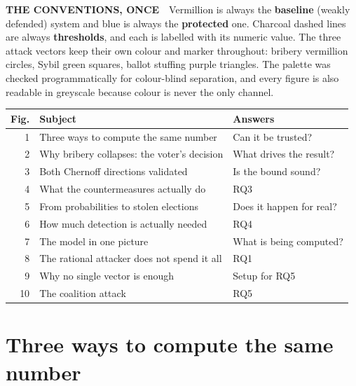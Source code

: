 \documentclass[11pt,a4paper]{article}
\begin{document}
\begin{readbox}
\textsf{\bfseries\footnotesize THE CONVENTIONS, ONCE}\ \
Vermillion is always the \textbf{baseline} (weakly defended) system and
blue is always the \textbf{protected} one. Charcoal dashed lines are
always \textbf{thresholds}, and each is labelled with its numeric value.
The three attack vectors keep their own colour and marker throughout:
bribery vermillion circles, Sybil green squares, ballot stuffing purple
triangles. The palette was checked programmatically for
colour-blind separation, and every figure is also readable in greyscale
because colour is never the only channel.
\end{readbox}

\vspace{0.4em}

\begin{center}
\small
\begin{tabular}{@{}rp{9.0cm}l@{}}
\toprule
\textbf{Fig.} & \textbf{Subject} & \textbf{Answers} \\
\midrule
1  & Three ways to compute the same number       & Can it be trusted? \\
2  & Why bribery collapses: the voter's decision & What drives the result? \\
3  & Both Chernoff directions validated          & Is the bound sound? \\
4  & What the countermeasures actually do        & RQ3 \\
5  & From probabilities to stolen elections      & Does it happen for real? \\
6  & How much detection is actually needed       & RQ4 \\
7  & The model in one picture                    & What is being computed? \\
8  & The rational attacker does not spend it all & RQ1 \\
9  & Why no single vector is enough              & Setup for RQ5 \\
10 & The coalition attack                        & RQ5 \\
\bottomrule
\end{tabular}
\end{center}

\clearpage
\section{Three ways to compute the same number}
\end{document}
